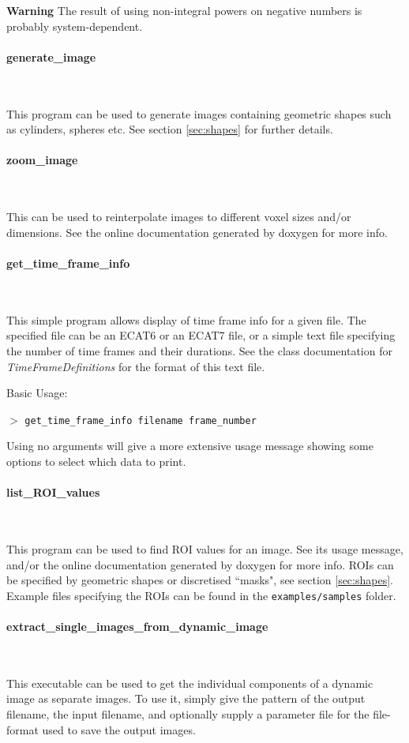 \documentclass{article}
\newcommand{\subsubsubsection}[1]{\paragraph{#1}\mbox{} \\}
\newcommand{\cmdline}[1]{\par \noindent $>$ \texttt{#1}\par}
\begin{document}
\textbf{Warning} The result of using non-integral powers on negative 
numbers is probably system-dependent.

{ \subsubsubsection{generate\_image}
\label{sec:generate_image}}

This program can be used to generate 
images containing geometric shapes such as cylinders, spheres 
etc. See section \ref{sec:shapes} for further details.

{ \subsubsubsection{zoom\_image}
}

This can be used to reinterpolate 
images to different voxel sizes and/or dimensions. See the online 
documentation generated by doxygen for more info.

{ \subsubsubsection{get\_time\_frame\_info}
}
\label{sec:get_time_frame_info}
This simple program allows display of time frame info for a given 
file. The specified file can be an ECAT6 or an ECAT7 file, or 
a simple text file specifying the number of time frames and their 
durations. See the class documentation for \textit{TimeFrameDefinitions} 
for the format of this text file.


\noindent
Basic Usage:
\cmdline{get\_time\_frame\_info filename frame\_number}


Using no arguments will give a more extensive usage message showing 
some options to select which data to print.

{ \subsubsubsection{list\_ROI\_values}
\label{sec:list_ROI_values}}

This program can be used to find 
ROI values for an image. See its usage message, and/or the online documentation generated 
by doxygen for more info. ROIs can be specified by geometric shapes or
discretised ``masks", see section \ref{sec:shapes}.
Example files specifying the ROIs can be found in the
\texttt{examples/samples} folder.

{ \subsubsubsection{extract\_single\_images\_from\_dynamic\_image}
}

This executable can be used to get the individual components of a 
dynamic image as separate images. 
To use it, simply give the pattern of the output filename, the input filename, and optionally
supply a parameter file for the file-format used to save the output images.
\end{document}
